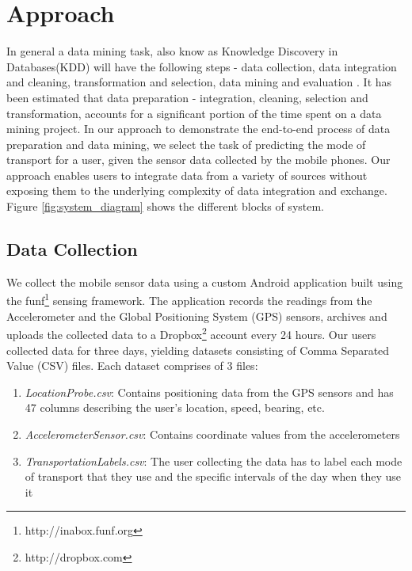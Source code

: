 \section{Approach}

In general a data mining task, also know as Knowledge Discovery in Databases(KDD) will have the following steps - data collection, data integration and cleaning, transformation and selection, data mining and evaluation \cite{Fayyad:1996:DMK:257938.257942}. It has been estimated that data preparation - integration, cleaning, selection and transformation, accounts for a significant portion of the time spent on a data mining project. In our approach to demonstrate the end-to-end process of data preparation and data mining, we select the task of predicting the mode of transport for a user, given the sensor data collected by the mobile phones. Our approach enables users to integrate data from a variety of sources without exposing them to the underlying complexity of data integration and exchange. Figure \ref{fig:system_diagram} shows the different blocks of system.
 
\subsection{Data Collection}
We collect the mobile sensor data using a custom Android application built using the funf\footnote{http://inabox.funf.org} sensing framework. The application records the readings from the Accelerometer and the Global Positioning System (GPS) sensors, archives and uploads the collected data to a Dropbox\footnote{http://dropbox.com} account every 24 hours. Our users collected data for three days, yielding datasets consisting of Comma Separated Value (CSV) files. Each dataset comprises of 3 files:

\begin{enumerate}
  \item \textit{LocationProbe.csv}: Contains positioning data from the GPS sensors and has 47 columns describing the user's location, speed, bearing, etc.
  \item \textit{AccelerometerSensor.csv}: Contains coordinate values from the accelerometers
  \item \textit{TransportationLabels.csv}: The user collecting the data has to label each mode of transport that they use and the specific intervals of the day when they use it
\end{enumerate} 

